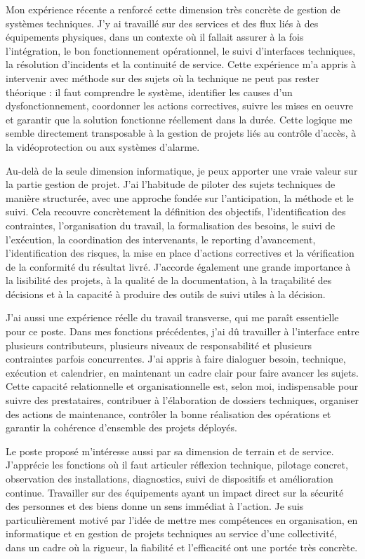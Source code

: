 \documentclass[11pt,a4paper]{altacv}
\begin{document}
{Mon expérience récente a renforcé cette dimension très concrète de gestion de systèmes techniques. J'y ai travaillé sur des services et des flux liés à des équipements physiques, dans un contexte où il fallait assurer à la fois l'intégration, le bon fonctionnement opérationnel, le suivi d'interfaces techniques, la résolution d'incidents et la continuité de service. Cette expérience m'a appris à intervenir avec méthode sur des sujets où la technique ne peut pas rester théorique : il faut comprendre le système, identifier les causes d'un dysfonctionnement, coordonner les actions correctives, suivre les mises en oeuvre et garantir que la solution fonctionne réellement dans la durée. Cette logique me semble directement transposable à la gestion de projets liés au contrôle d'accès, à la vidéoprotection ou aux systèmes d'alarme.

Au-delà de la seule dimension informatique, je peux apporter une vraie valeur sur la partie gestion de projet. J'ai l'habitude de piloter des sujets techniques de manière structurée, avec une approche fondée sur l'anticipation, la méthode et le suivi. Cela recouvre concrètement la définition des objectifs, l'identification des contraintes, l'organisation du travail, la formalisation des besoins, le suivi de l'exécution, la coordination des intervenants, le reporting d'avancement, l'identification des risques, la mise en place d'actions correctives et la vérification de la conformité du résultat livré. J'accorde également une grande importance à la lisibilité des projets, à la qualité de la documentation, à la traçabilité des décisions et à la capacité à produire des outils de suivi utiles à la décision.

J'ai aussi une expérience réelle du travail transverse, qui me paraît essentielle pour ce poste. Dans mes fonctions précédentes, j'ai dû travailler à l'interface entre plusieurs contributeurs, plusieurs niveaux de responsabilité et plusieurs contraintes parfois concurrentes. J'ai appris à faire dialoguer besoin, technique, exécution et calendrier, en maintenant un cadre clair pour faire avancer les sujets. Cette capacité relationnelle et organisationnelle est, selon moi, indispensable pour suivre des prestataires, contribuer à l'élaboration de dossiers techniques, organiser des actions de maintenance, contrôler la bonne réalisation des opérations et garantir la cohérence d'ensemble des projets déployés.

Le poste proposé m'intéresse aussi par sa dimension de terrain et de service. J'apprécie les fonctions où il faut articuler réflexion technique, pilotage concret, observation des installations, diagnostics, suivi de dispositifs et amélioration continue. Travailler sur des équipements ayant un impact direct sur la sécurité des personnes et des biens donne un sens immédiat à l'action. Je suis particulièrement motivé par l'idée de mettre mes compétences en organisation, en informatique et en gestion de projets techniques au service d'une collectivité, dans un cadre où la rigueur, la fiabilité et l'efficacité ont une portée très concrète.

}
\end{document}
